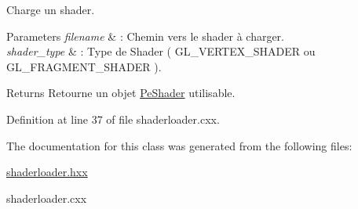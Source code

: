 Charge un shader. 


\begin{DoxyParams}{Parameters}
{\em filename} & \-: Chemin vers le shader à charger. \\
\hline
{\em shader\-\_\-type} & \-: Type de Shader ( G\-L\-\_\-\-V\-E\-R\-T\-E\-X\-\_\-\-S\-H\-A\-D\-E\-R ou G\-L\-\_\-\-F\-R\-A\-G\-M\-E\-N\-T\-\_\-\-S\-H\-A\-D\-E\-R ). \\
\hline
\end{DoxyParams}
\begin{DoxyReturn}{Returns}
Retourne un objet \hyperlink{structPeGL_1_1PeShader}{Pe\-Shader} utilisable. 
\end{DoxyReturn}


Definition at line 37 of file shaderloader.\-cxx.



The documentation for this class was generated from the following files\-:\begin{DoxyCompactItemize}
\item 
\hyperlink{shaderloader_8hxx}{shaderloader.\-hxx}\item 
shaderloader.\-cxx\end{DoxyCompactItemize}

